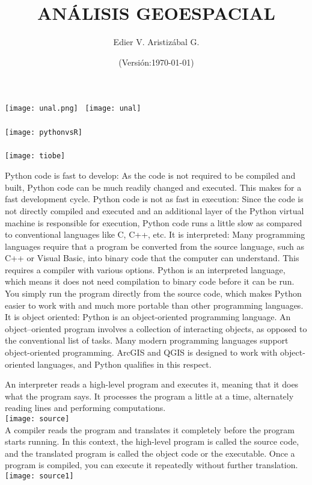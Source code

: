 \documentclass[12pt]{beamer}
\title[Ambiente de Trabajo]{ANÁLISIS GEOESPACIAL}
\author[Edier Aristizábal]{Edier V. Aristizábal G.}
\institute{\emph{evaristizabalg@unal.edu.co}}
\date{(Versión:\today)}
\begin{document}
\begin{frame}
\titlepage
\centering
	\texttt{[image: unal.png]}\hspace*{4.75cm}~%
   	\texttt{[image: unal]} 
\end{frame}
\begin{frame}
\frametitle{}
\centering
	\texttt{[image: pythonvsR]} 
\end{frame}
\begin{frame}
\frametitle{}
\centering
	\texttt{[image: tiobe]} 
\end{frame}
\begin{frame}
\scriptsize {
\alert{Python code is fast to develop}: As the code is not required to be compiled and built, Python code can be much readily changed and executed. This makes for a fast development cycle.\vfill
\alert{Python code is not as fast in execution}: Since the code is not directly compiled and executed and an additional layer of the Python virtual machine is responsible for execution, Python code runs a little slow as compared to conventional languages like C, C++, etc.\vfill
\alert{It is interpreted}: Many programming languages require that a program be converted from the source language, such as C++ or Visual Basic, into binary code that the computer can understand. This requires a compiler with various options. Python is an interpreted language, which means it does not need compilation to binary code before it can be run. You simply run the program directly from the source code, which makes Python easier to work with and much more portable than other programming languages.\vfill
\alert{It is object oriented}: Python is an object-oriented programming language. An object--oriented program involves a collection of interacting objects, as opposed to the conventional list of tasks. Many modern programming languages support object-oriented programming. ArcGIS and QGIS is designed to work with object-oriented languages, and Python qualifies in this respect.
}
\end{frame} 
\begin{frame}
\scriptsize{\alert{An interpreter} reads a high-level program and executes it, meaning that it does what the program says. It processes the program a little at a time, alternately reading lines and performing computations.}\\
\texttt{[image: source]}\\
\vfill
\scriptsize{\alert{A compiler} reads the program and translates it completely before the program starts running.
In this context, the high-level program is called the source code, and the translated program is called the object code or the executable. Once a program is compiled, you can execute it repeatedly without further translation.} 
\texttt{[image: source1]}
\end{frame} 
\end{document}

